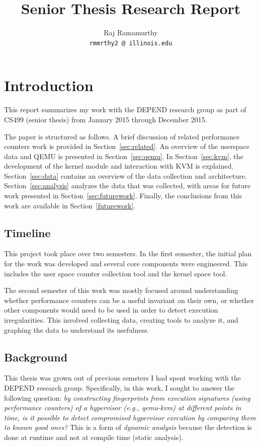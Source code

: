 \documentclass[notitlepage]{article}
\begin{document}
\title{Senior Thesis Research Report}
\author{Raj Ramamurthy\\
  \texttt{rmmrthy2 @ illinois.edu}}
\maketitle


\section{Introduction}
\label{sec:intro} This report summarizes my work with the DEPEND research group
as part of CS499 (senior thesis) from January 2015 through December 2015.

The paper is structured as follows. A brief discussion of related performance
counters work is provided in Section~\ref{sec:related}. An overview of the
userspace data and QEMU is presented in Section~\ref{sec:qemu}. In
Section~\ref{sec:kvm}, the development of the kernel module and interaction with
KVM is explained. Section~\ref{sec:data} contains an overview of the data
collection and architecture. Section~\ref{sec:analysis} analyzes the data that
was collected, with areas for future work presented in
Section~\ref{sec:futurework}. Finally, the conclusions from this work are
available in Section~\ref{futurework}.

\subsection{Timeline}
This project took place over two semesters. In the first semester, the initial
plan for the work was developed and several core components were engineered.
This includes the user space counter collection tool and the kernel space tool.

The second semester of this work was mostly focused around understanding whether
performance counters can be a useful invariant on their own, or whether other
components would need to be used in order to detect execution irregularities.
This involved collecting data, creating tools to analyze it, and graphing the
data to understand its usefulness.

\subsection{Background}
This thesis was grown out of previous semsters I had spent working with the
DEPEND research group. Specifically, in this work,  I sought to answer the
following question:
\textit{by constructing fingerprints
    from execution signatures (using performance counters) of a hypervisor
    (e.g., qemu-kvm) at different points in time, is it possible to detect
    compromised hypervisor execution by comparing them to known good ones?} This
    is a form of \textit{dynamic analysis} because the detection is done at
    runtime and not at compile time (static analysis).
\end{document}
